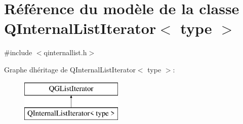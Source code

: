 \hypertarget{class_q_internal_list_iterator}{}\section{Référence du modèle de la classe Q\+Internal\+List\+Iterator$<$ type $>$}
\label{class_q_internal_list_iterator}


{\ttfamily \#include $<$qinternallist.\+h$>$}

Graphe d\textquotesingle{}héritage de Q\+Internal\+List\+Iterator$<$ type $>$\+:\begin{figure}[H]
\begin{center}
\leavevmode
\includegraphics[height=2.000000cm]{class_q_internal_list_iterator}
\end{center}
\end{figure}
